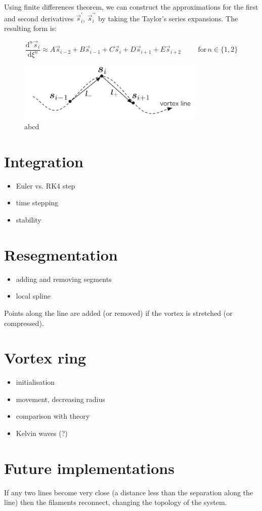 Using finite differences theorem, we can construct the approximations for the first and second derivatives
$\vec{s}_i^{\prime}$, $\vec{s}_i^{\prime\prime}$ by taking the Taylor's series expansions. The resulting form is:

\begin{equation}
\frac{\text{d}^n\vec{s}_i}{\text{d}\xi^n} \approx
A\vec{s}_{i-2} + B\vec{s}_{i-1} + C\vec{s}_{i} + D\vec{s}_{i+1} + E\vec{s}_{i+2}
\hspace{1cm}
\text{for} \,n\in\{1,2\}
\end{equation}

\begin{figure}[h]
	\centering
	\includegraphics[width=0.8\textwidth]{graphics/simul/finite-diff}
	\caption{abcd}
\end{figure}







\section{Integration}
\begin{itemize}
	\item Euler vs. RK4 step
	\item time stepping
	\item stability
\end{itemize}

\section{Resegmentation}
\begin{itemize}
	\item adding and removing segments
	\item local spline
\end{itemize}

Points along the line are added (or removed) if the vortex is stretched (or compressed).

\section{Vortex ring}
\begin{itemize}
	\item initialisation
	\item movement, decreasing radius
	\item comparison with theory
	\item Kelvin waves (?)
\end{itemize}

\section{Future implementations}

If any two lines become very close (a distance less than the separation along the line) then the filaments reconnect, changing the topology of the system.

\newpage
